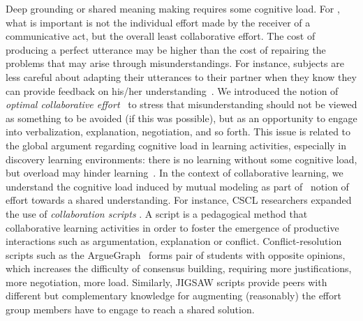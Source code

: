 \documentclass[twocolumn]{article}
\begin{document}
Deep grounding or shared meaning making requires some cognitive load. For
\citet{clark1986referring}, what is important is not the individual effort made
by the receiver of a communicative act, but the overall least collaborative
effort.  The cost of producing a perfect utterance may be higher than the cost
of repairing the problems that may arise through misunderstandings. For
instance, subjects are less careful about adapting their utterances to their
partner when they know they can provide feedback on his/her
understanding~\citep{schober1993spatial}. We introduced the notion of
\emph{optimal collaborative effort}~\citep{dillenbourg1995evolution} to stress
that misunderstanding should not be viewed as something to be avoided (if this
was possible), but as an opportunity to engage into verbalization, explanation,
negotiation, and so forth. This issue is related to the global argument
regarding cognitive load in learning activities, especially in discovery
learning environments: there is no learning without some cognitive load, but
overload may hinder learning~\citep{paas2003cognitive}. In the context of
collaborative learning, we understand the cognitive load induced by mutual
modeling as part of~\citet{schwartz1995emergence} notion of effort towards a
shared understanding. For instance, CSCL researchers expanded the use of
\emph{collaboration scripts} . A script is a pedagogical
method that collaborative learning activities in order to foster the emergence
of productive interactions such as argumentation, explanation or conflict.
Conflict-resolution scripts such as the {\sc
ArgueGraph}~\citep{dillenbourg2008mechanics} forms pair of students with
opposite opinions, which increases the difficulty of consensus building,
requiring more justifications, more negotiation, more load. Similarly, JIGSAW
scripts provide peers with different but complementary knowledge for augmenting
(reasonably) the effort group members have to engage to reach a shared solution. 
\end{document}

